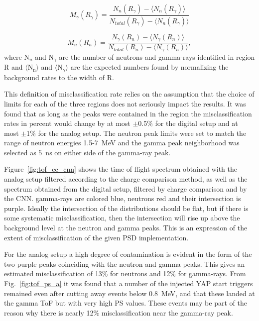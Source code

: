 \documentclass[main.tex]{subfiles}
\begin{document}
\begin{equation}
	M_\gamma(R_\gamma) = \frac{N_{n}(R_\gamma)-\langle N_n(R_\gamma)\rangle}{N_{total}(R_\gamma)-\langle N_n(R_\gamma)\rangle}
\end{equation}

\begin{equation}
	M_n(R_n) = \frac{N_{\gamma}(R_n)-\langle N_\gamma(R_n)\rangle}{N_{total}(R_n)-\langle N_\gamma(R_n)\rangle},
\end{equation}
where N$_n$ and N$_\gamma$ are the number of neutrons and gamma-rays identified in region R and $\langle \textrm{N}_\textrm{n}\rangle$ and $\langle \textrm{N}_\gamma\rangle$ are the expected numbers found by normalizing the background rates to the width of R.

This definition of misclassification rate relies on the assumption that the choice of limits for each of the three regions does not seriously impact the results. It was found that as long as the peaks were contained in the region the misclassification rates in percent would change by at most $\pm$0.5\% for the digital setup and at most $\pm$1\% for the analog setup. The neutron peak limits were set to match the range of neutron energies 1.5-\SI{7}{\MeV} and the gamma peak neighborhood was selected as \SI{5}{\ns} on either side of the gamma-ray peak.

Figure~\ref{fig:tof_cc_cnn} shows the time of flight spectrum obtained with the analog setup filtered according to the charge comparison method, as well as the spectrum obtained from the digital setup, filtered by charge comparison and by the CNN. gamma-rays are colored blue, neutrons red and their intersection is purple. Ideally the intersection of the distributions should be flat, but if there is some systematic misclassification, then the intersection will rise up above the background level at the neutron and gamma peaks. This is an expression of the extent of misclassification of the given PSD implementation.

For the analog setup a high degree of contamination is evident in the form of the two purple peaks coinciding with the neutron and gamma peaks. This gives an estimated misclassification of 13\% for neutrons and 12\% for gamma-rays. From Fig.~\ref{fig:tof_ps_a} it was found that a number of the injected YAP start triggers remained even after cutting away events below \SI{0.8}{\MeV}, and that these landed at the gamma ToF but with very high PS values. These events may be part of the reason why there is nearly 12\% misclassification near the gamma-ray peak.
\end{document}
